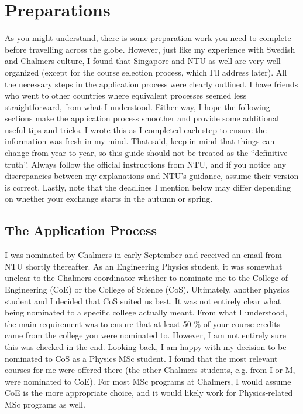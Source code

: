 \chapter*{Preparations}
\vspace{-0.6cm}
As you might understand, there is some preparation work you need to complete before travelling across the globe. However, just like my experience with Swedish and Chalmers culture, I found that Singapore and NTU as well are very well organized (except for the course selection process, which I'll address later). All the necessary steps in the application process were clearly outlined. I have friends who went to other countries where equivalent processes seemed less straightforward, from what I understood. Either way, I hope the following sections make the application process smoother and provide some additional useful tips and tricks. I wrote this as I completed each step to ensure the information was fresh in my mind. That said, keep in mind that things can change from year to year, so this guide should not be treated as the ``definitive truth''. Always follow the official instructions from NTU, and if you notice any discrepancies between my explanations and NTU's guidance, assume their version is correct. Lastly, note that the deadlines I mention below may differ depending on whether your exchange starts in the autumn or spring. 
\vspace{-0.25cm}
\section*{The Application Process}\label{app}
{}
I was nominated by Chalmers in early September and received an email from NTU shortly thereafter. As an Engineering Physics student, it was somewhat unclear to the Chalmers coordinator whether to nominate me to the College of Engineering (CoE) or the College of Science (CoS). Ultimately, another physics student and I decided that CoS suited us best. It was not entirely clear what being nominated to a specific college actually meant. From what I understood, the main requirement was to ensure that at least 50 \% of your course credits came from the college you were nominated to. However, I am not entirely sure this was checked in the end. Looking back, I am happy with my decision to be nominated to CoS as a Physics MSc student. I found that the most relevant courses for me were offered there (the other Chalmers students, e.g. from I or M, were nominated to CoE). For most MSc programs at Chalmers, I would assume CoE is the more appropriate choice, and it would likely work for Physics-related MSc programs as well. 

